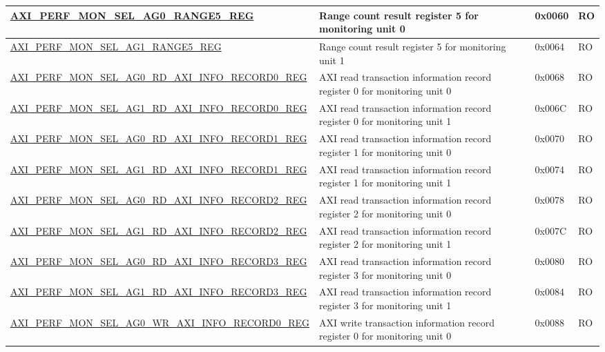 \begin{longtable}{ | p{9.1cm} | p{5cm} | p{1.3cm} | p{1.4cm} | }
\hyperref[regdesc:AXIPERFMONSELAGNRANGEMREG]{AXI\_PERF\_MON\_SEL\_AG0\_RANGE5\_REG} & Range count result register 5 for monitoring unit 0 & 0x0060 & RO\\ \hline
\hyperref[regdesc:AXIPERFMONSELAGNRANGEMREG]{AXI\_PERF\_MON\_SEL\_AG1\_RANGE5\_REG} & Range count result register 5 for monitoring unit 1 & 0x0064 & RO\\ \hline
\hyperref[regdesc:AXIPERFMONSELAGNRDAXIINFORECORDMREG]{AXI\_PERF\_MON\_SEL\_AG0\_RD\_AXI\_INFO\_RECORD0\_REG} & AXI read transaction information record register 0 for monitoring unit 0 & 0x0068 & RO\\ \hline
\hyperref[regdesc:AXIPERFMONSELAGNRDAXIINFORECORDMREG]{AXI\_PERF\_MON\_SEL\_AG1\_RD\_AXI\_INFO\_RECORD0\_REG} & AXI read transaction information record register 0 for monitoring unit 1 & 0x006C & RO\\ \hline
\hyperref[regdesc:AXIPERFMONSELAGNRDAXIINFORECORDMREG]{AXI\_PERF\_MON\_SEL\_AG0\_RD\_AXI\_INFO\_RECORD1\_REG} & AXI read transaction information record register 1 for monitoring unit 0 & 0x0070 & RO\\ \hline
\hyperref[regdesc:AXIPERFMONSELAGNRDAXIINFORECORDMREG]{AXI\_PERF\_MON\_SEL\_AG1\_RD\_AXI\_INFO\_RECORD1\_REG} & AXI read transaction information record register 1 for monitoring unit 1 & 0x0074 & RO\\ \hline
\hyperref[regdesc:AXIPERFMONSELAGNRDAXIINFORECORDMREG]{AXI\_PERF\_MON\_SEL\_AG0\_RD\_AXI\_INFO\_RECORD2\_REG} & AXI read transaction information record register 2 for monitoring unit 0 & 0x0078 & RO\\ \hline
\hyperref[regdesc:AXIPERFMONSELAGNRDAXIINFORECORDMREG]{AXI\_PERF\_MON\_SEL\_AG1\_RD\_AXI\_INFO\_RECORD2\_REG} & AXI read transaction information record register 2 for monitoring unit 1 & 0x007C & RO\\ \hline
\hyperref[regdesc:AXIPERFMONSELAGNRDAXIINFORECORDMREG]{AXI\_PERF\_MON\_SEL\_AG0\_RD\_AXI\_INFO\_RECORD3\_REG} & AXI read transaction information record register 3 for monitoring unit 0 & 0x0080 & RO\\ \hline
\hyperref[regdesc:AXIPERFMONSELAGNRDAXIINFORECORDMREG]{AXI\_PERF\_MON\_SEL\_AG1\_RD\_AXI\_INFO\_RECORD3\_REG} & AXI read transaction information record register 3 for monitoring unit 1 & 0x0084 & RO\\ \hline
\hyperref[regdesc:AXIPERFMONSELAGNWRAXIINFORECORDMREG]{AXI\_PERF\_MON\_SEL\_AG0\_WR\_AXI\_INFO\_RECORD0\_REG} & AXI write transaction information record register 0 for monitoring unit 0 & 0x0088 & RO\\ \hline

\end{longtable}
